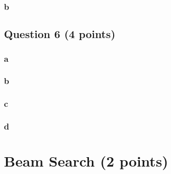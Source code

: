 \documentclass[11pt,letter]{article}
\begin{document}
\subsubsection*{b}

\subsection*{Question 6 (4 points)}
\subsubsection*{a}
\subsubsection*{b}
\subsubsection*{c}
\subsubsection*{d}

\section*{Beam Search (2 points)}
\end{document}
